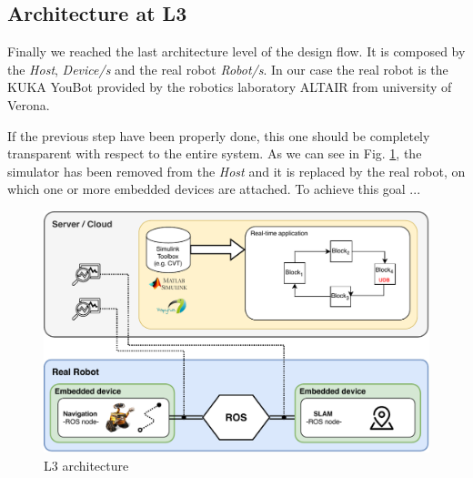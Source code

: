 \subsection{Architecture at L3}	%
Finally we reached the last architecture level of the design flow. It is composed by the \textit{Host}, \textit{Device/s } and the real robot \textit{Robot/s}. In our case the real robot is the KUKA YouBot \cite{YouBot} provided by the robotics laboratory ALTAIR  from university of Verona.



If the previous step have been properly done, this one should be completely 
transparent with respect to the entire system. 
As we can see in Fig. \ref{fig:l3archexp}, the simulator has been removed from the \textit{Host} and it is replaced by the real robot, on which one or more embedded devices are attached.
To achieve this goal ... 


\begin{figure}
	\centering
	\includegraphics[width=\textwidth]{images/L3-arch}
	\caption{L3 architecture}
	\label{fig:l3archexp}
\end{figure}


